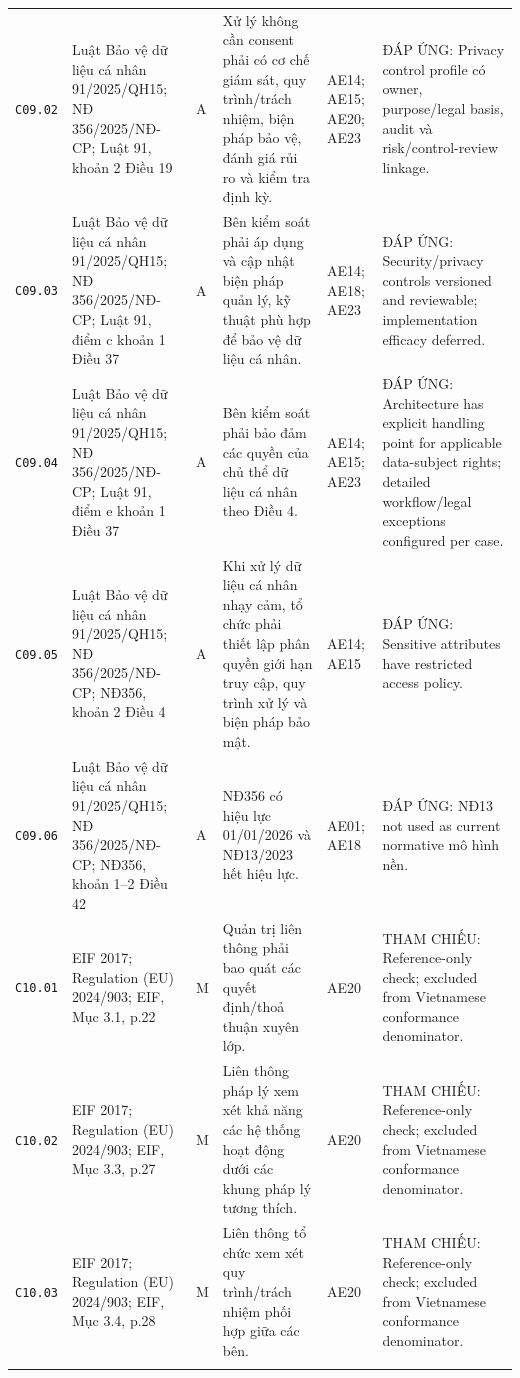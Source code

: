 \begin{longtable}{@{}p{0.9cm}p{3.0cm}p{0.55cm}p{4.05cm}p{2.0cm}p{3.45cm}@{}}
\texttt{C09.02} & Luật Bảo vệ dữ liệu cá nhân 91/2025/QH15; NĐ 356/2025/NĐ-CP; Luật 91, khoản 2 Điều 19 & A & Xử lý không cần consent phải có cơ chế giám sát, quy trình/trách nhiệm, biện pháp bảo vệ, đánh giá rủi ro và kiểm tra định kỳ. & AE14; AE15; AE20; AE23 & ĐÁP ỨNG: Privacy control profile có owner, purpose/legal basis, audit và risk/control-review linkage. \\ \addlinespace[1pt]
\texttt{C09.03} & Luật Bảo vệ dữ liệu cá nhân 91/2025/QH15; NĐ 356/2025/NĐ-CP; Luật 91, điểm c khoản 1 Điều 37 & A & Bên kiểm soát phải áp dụng và cập nhật biện pháp quản lý, kỹ thuật phù hợp để bảo vệ dữ liệu cá nhân. & AE14; AE18; AE23 & ĐÁP ỨNG: Security/privacy controls versioned and reviewable; implementation efficacy deferred. \\ \addlinespace[1pt]
\texttt{C09.04} & Luật Bảo vệ dữ liệu cá nhân 91/2025/QH15; NĐ 356/2025/NĐ-CP; Luật 91, điểm e khoản 1 Điều 37 & A & Bên kiểm soát phải bảo đảm các quyền của chủ thể dữ liệu cá nhân theo Điều 4. & AE14; AE15; AE23 & ĐÁP ỨNG: Architecture has explicit handling point for applicable data-subject rights; detailed workflow/legal exceptions configured per case. \\ \addlinespace[1pt]
\texttt{C09.05} & Luật Bảo vệ dữ liệu cá nhân 91/2025/QH15; NĐ 356/2025/NĐ-CP; NĐ356, khoản 2 Điều 4 & A & Khi xử lý dữ liệu cá nhân nhạy cảm, tổ chức phải thiết lập phân quyền giới hạn truy cập, quy trình xử lý và biện pháp bảo mật. & AE14; AE15 & ĐÁP ỨNG: Sensitive attributes have restricted access policy. \\ \addlinespace[1pt]
\texttt{C09.06} & Luật Bảo vệ dữ liệu cá nhân 91/2025/QH15; NĐ 356/2025/NĐ-CP; NĐ356, khoản 1--2 Điều 42 & A & NĐ356 có hiệu lực 01/01/2026 và NĐ13/2023 hết hiệu lực. & AE01; AE18 & ĐÁP ỨNG: NĐ13 not used as current normative mô hình nền. \\ \addlinespace[1pt]
\texttt{C10.01} & EIF 2017; Regulation (EU) 2024/903; EIF, Mục 3.1, p.22 & M & Quản trị liên thông phải bao quát các quyết định/thoả thuận xuyên lớp. & AE20 & THAM CHIẾU: Reference-only check; excluded from Vietnamese conformance denominator. \\ \addlinespace[1pt]
\texttt{C10.02} & EIF 2017; Regulation (EU) 2024/903; EIF, Mục 3.3, p.27 & M & Liên thông pháp lý xem xét khả năng các hệ thống hoạt động dưới các khung pháp lý tương thích. & AE20 & THAM CHIẾU: Reference-only check; excluded from Vietnamese conformance denominator. \\ \addlinespace[1pt]
\texttt{C10.03} & EIF 2017; Regulation (EU) 2024/903; EIF, Mục 3.4, p.28 & M & Liên thông tổ chức xem xét quy trình/trách nhiệm phối hợp giữa các bên. & AE20 & THAM CHIẾU: Reference-only check; excluded from Vietnamese conformance denominator. \\ \addlinespace[1pt]

\end{longtable}
